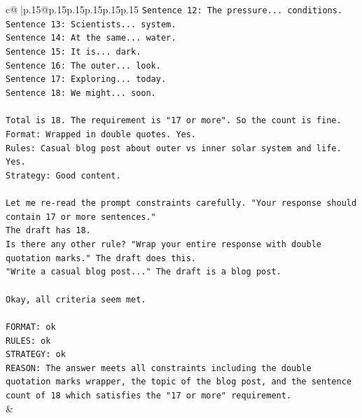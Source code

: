 \documentclass{article}
\begin{document}
{\begin{supertabular}{c@{$\;$}|p{.15\linewidth}@{}p{.15\linewidth}p{.15\linewidth}p{.15\linewidth}p{.15\linewidth}p{.15\linewidth}}
{{{\texttt{Sentence 12: The pressure... conditions.} \\
\texttt{Sentence 13: Scientists... system.} \\
\texttt{Sentence 14: At the same... water.} \\
\texttt{Sentence 15: It is... dark.} \\
\texttt{Sentence 16: The outer... look.} \\
\texttt{Sentence 17: Exploring... today.} \\
\texttt{Sentence 18: We might... soon.} \\
\\ 
\texttt{Total is 18. The requirement is "17 or more". So the count is fine.} \\
\texttt{Format: Wrapped in double quotes. Yes.} \\
\texttt{Rules: Casual blog post about outer vs inner solar system and life. Yes.} \\
\texttt{Strategy: Good content.} \\
\\ 
\texttt{Let me re{-}read the prompt constraints carefully. "Your response should contain 17 or more sentences."} \\
\texttt{The draft has 18.} \\
\texttt{Is there any other rule? "Wrap your entire response with double quotation marks." The draft does this.} \\
\texttt{"Write a casual blog post..." The draft is a blog post.} \\
\\ 
\texttt{Okay, all criteria seem met.} \\
\\ 
\texttt{FORMAT: ok} \\
\texttt{RULES: ok} \\
\texttt{STRATEGY: ok} \\
\texttt{REASON: The answer meets all constraints including the double quotation marks wrapper, the topic of the blog post, and the sentence count of 18 which satisfies the "17 or more" requirement.} \\
            }
        }
    }
    & \\ \\


\end{supertabular}}
\end{document}
